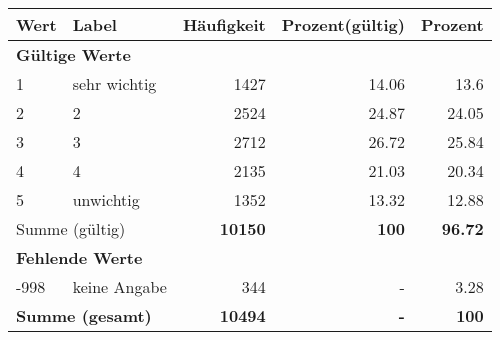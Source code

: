      \begin{longtable}{lXrrr}
     \toprule
     \textbf{Wert} & \textbf{Label} & \textbf{Häufigkeit} & \textbf{Prozent(gültig)} & \textbf{Prozent} \\
     \endhead
     \midrule
     \multicolumn{5}{l}{\textbf{Gültige Werte}}\\

     1 &
     \multicolumn{1}{X}{ sehr wichtig   } &


       \num{1427} &
       \num[round-mode=places,round-precision=2]{14,06} &
         \num[round-mode=places,round-precision=2]{13,6} \\

     2 &
     \multicolumn{1}{X}{ 2   } &


       \num{2524} &
       \num[round-mode=places,round-precision=2]{24,87} &
         \num[round-mode=places,round-precision=2]{24,05} \\

     3 &
     \multicolumn{1}{X}{ 3   } &


       \num{2712} &
       \num[round-mode=places,round-precision=2]{26,72} &
         \num[round-mode=places,round-precision=2]{25,84} \\

     4 &
     \multicolumn{1}{X}{ 4   } &


       \num{2135} &
       \num[round-mode=places,round-precision=2]{21,03} &
         \num[round-mode=places,round-precision=2]{20,34} \\

     5 &
     \multicolumn{1}{X}{ unwichtig   } &


       \num{1352} &
       \num[round-mode=places,round-precision=2]{13,32} &
         \num[round-mode=places,round-precision=2]{12,88} \\
     \midrule
     \multicolumn{2}{l}{Summe (gültig)} &
       \textbf{\num{10150}} &
     \textbf{100} &
       \textbf{\num[round-mode=places,round-precision=2]{96,72}} \\
     \multicolumn{5}{l}{\textbf{Fehlende Werte}}\\
       -998 &
       keine Angabe &
         \num{344} &
        - &
         \num[round-mode=places,round-precision=2]{3,28} \\
     \midrule
     \multicolumn{2}{l}{\textbf{Summe (gesamt)}} &
          \textbf{\num{10494}} &
        \textbf{-} &
        \textbf{100} \\
     \bottomrule
     \end{longtable}
     
